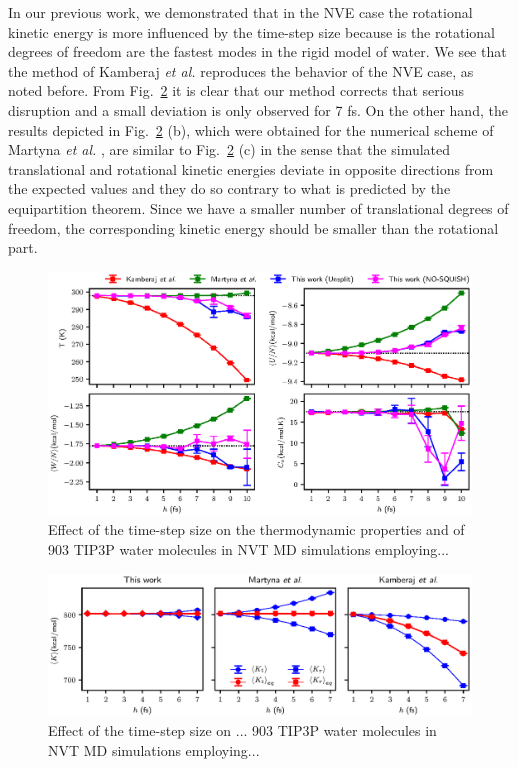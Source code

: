 \documentclass[
journal=jctcce,
layout=twocolumn
]{achemso}
\begin{document}
In our previous work\cite{Silveira_2017}, we demonstrated that in the NVE case the rotational kinetic energy is more influenced by the time-step size because is the rotational degrees of freedom are the fastest modes in the rigid model of water. 
We see that the method of Kamberaj \textit{et al.} \cite{Kamberaj_2005} reproduces the behavior of the NVE case, as noted before.
From Fig.~\ref{fig:energy_partition} it is clear that our method corrects that serious disruption and a small deviation is only observed for 7 fs.
On the other hand, the results depicted in Fig.~\ref{fig:energy_partition} (b), which were obtained for the numerical scheme of Martyna \textit{et al.} \cite{Martyna_1996}, are similar to Fig.~\ref{fig:energy_partition} (c) in the sense that the simulated translational and rotational kinetic energies deviate in opposite directions from the expected values and they do so contrary to what is predicted by the equipartition theorem.
Since we have a smaller number of translational degrees of freedom, the corresponding kinetic energy should be smaller than the rotational part.

\begin{figure}
	\includegraphics{Figures/thermodynamic_properties.eps}
	\caption{Effect of the time-step size on the thermodynamic properties and of 903 TIP3P\cite{Jorgensen_1983} water molecules in NVT MD simulations employing...}
	\label{fig:properties}
\end{figure}

\begin{figure}
	\includegraphics{Figures/energy_partition.eps}
		\caption{Effect of the time-step size on ... 903 TIP3P\cite{Jorgensen_1983} water molecules in NVT MD simulations employing...}
	\label{fig:energy_partition}
\end{figure}
\end{document}

